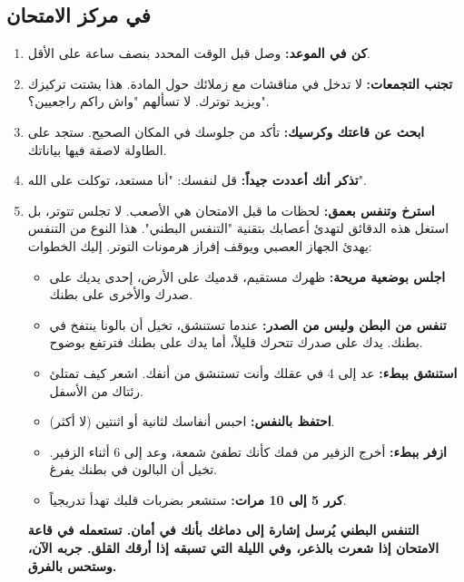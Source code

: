 \documentclass[12pt,a4paper]{book}
\newcommand{\importantAr}[1]{%
	\begin{important}
		\bfseries #1
	\end{important}
}
\begin{document}
	\subsection{في مركز الامتحان}
	\begin{enumerate}
		\item \textbf{كن في الموعد:} وصل قبل الوقت المحدد بنصف ساعة على الأقل.
		\item \textbf{تجنب التجمعات:} لا تدخل في مناقشات مع زملائك حول المادة. هذا يشتت تركيزك ويزيد توترك. لا تسألهم "واش راكم راجعيين؟".
		\item \textbf{ابحث عن قاعتك وكرسيك:} تأكد من جلوسك في المكان الصحيح. ستجد على الطاولة لاصقة فيها بياناتك.
		\item \textbf{تذكر أنك أعددت جيداً:} قل لنفسك: "أنا مستعد، توكلت على الله".
		\item \textbf{استرخ وتنفس بعمق:} لحظات ما قبل الامتحان هي الأصعب. لا تجلس تتوتر، بل استغل هذه الدقائق لتهدئ أعصابك بتقنية "التنفس البطني". هذا النوع من التنفس يهدئ الجهاز العصبي ويوقف إفراز هرمونات التوتر. إليك الخطوات:
		
		\begin{itemize}
			\item \textbf{اجلس بوضعية مريحة:} ظهرك مستقيم، قدميك على الأرض، إحدى يديك على صدرك والأخرى على بطنك.
			
			\item \textbf{تنفس من البطن وليس من الصدر:} عندما تستنشق، تخيل أن بالونا ينتفخ في بطنك. يدك على صدرك تتحرك قليلاً، أما يدك على بطنك فترتفع بوضوح.
			
			\item \textbf{استنشق ببطء:} عد إلى 4 في عقلك وأنت تستنشق من أنفك. اشعر كيف تمتلئ رئتاك من الأسفل.
			
			\item \textbf{احتفظ بالنفس:} احبس أنفاسك لثانية أو اثنتين (لا أكثر).
			
			\item \textbf{ازفر ببطء:} أخرج الزفير من فمك كأنك تطفئ شمعة، وعد إلى 6 أثناء الزفير. تخيل أن البالون في بطنك يفرغ.
			
			\item \textbf{كرر 5 إلى 10 مرات:} ستشعر بضربات قلبك تهدأ تدريجياً.
		\end{itemize}
		
		\importantAr{التنفس البطني يُرسل إشارة إلى دماغك بأنك في أمان. تستعمله في قاعة الامتحان إذا شعرت بالذعر، وفي الليلة التي تسبقه إذا أرقك القلق. جربه الآن، وستحس بالفرق.}
	\end{enumerate}
	
\end{document}
